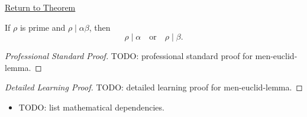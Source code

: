 \newpage
{}
\label{prf:men-euclid-lemma}

\begin{remark*}[Return]
\hyperref[thm:men-euclid-lemma]{Return to Theorem}
\end{remark*}

\begin{theorem*}
If \(\rho\) is prime and \(\rho\mid\alpha\beta\), then
\[
  \rho\mid\alpha
  \quad\text{or}\quad
  \rho\mid\beta.
\]
\end{theorem*}

\begin{proof}[Professional Standard Proof]
\LRAProofBodyStart
TODO: professional standard proof for men-euclid-lemma.
\end{proof}

\begin{proof}[Detailed Learning Proof]
\LRAProofBodyStart
TODO: detailed learning proof for men-euclid-lemma.
\end{proof}

\begin{remark*}
\end{remark*}

\begin{dependencies}
\begin{itemize}
  \item TODO: list mathematical dependencies.
\end{itemize}
\end{dependencies}

\clearpage
